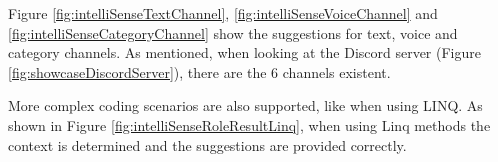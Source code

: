 

Figure \ref{fig:intelliSenseTextChannel}, \ref{fig:intelliSenseVoiceChannel} and \ref{fig:intelliSenseCategoryChannel} show the suggestions for text, voice and category channels. As mentioned, when looking at the Discord server (Figure \ref{fig:showcaseDiscordServer}), there are the 6 channels existent.

More complex coding scenarios are also supported, like when using LINQ.
As shown in Figure \ref{fig:intelliSenseRoleResultLinq}, when using Linq methods the context is determined and the suggestions are provided correctly.